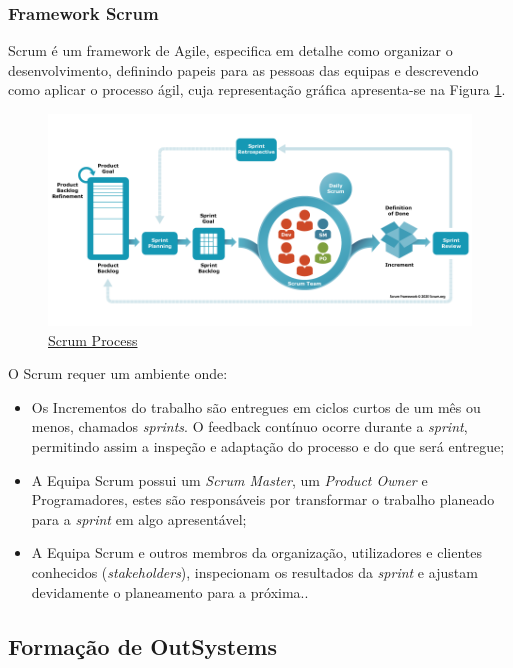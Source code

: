     \subsubsection{Framework Scrum}\label{subsec:scrum}
    
      Scrum é um framework de Agile, especifica em detalhe como organizar o desenvolvimento, definindo papeis para as pessoas das equipas e descrevendo como aplicar o processo ágil, cuja representação gráfica apresenta-se na Figura \ref{fig:scrum}.

      \begin{figure}[H]
          \centering
          \includegraphics[scale=0.50]{imgs/scrum.png}
          \caption{\href{https://www.scrum.org/resources/what-scrum-module}{Scrum Process}}\label{fig:scrum}
      \end{figure}

      O Scrum requer um ambiente onde:
      \begin{itemize}
        \item Os Incrementos do trabalho são entregues em ciclos curtos de um mês ou menos, chamados \textit{sprints}. O feedback contínuo ocorre durante a \textit{sprint}, permitindo assim a inspeção e adaptação do processo e do que será entregue;
        \item A Equipa Scrum possui um \textit{Scrum Master}, um \textit{Product Owner} e Programadores, estes são responsáveis por transformar o trabalho planeado para a \textit{sprint} em algo apresentável;
        \item A Equipa Scrum e outros membros da organização, utilizadores e clientes conhecidos (\textit{stakeholders}), inspecionam os resultados da \textit{sprint} e ajustam devidamente o planeamento para a próxima.\cite{scrum}.
      \end{itemize}
    
    \subsection{Formação de OutSystems}\label{subsec:outsystems}


